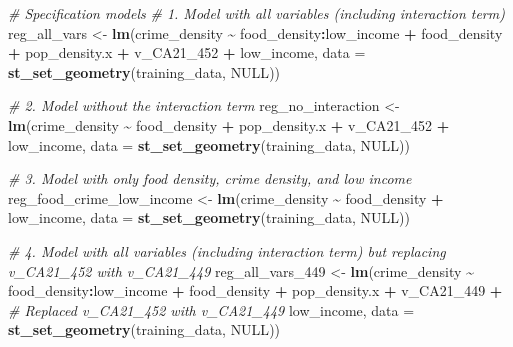 \documentclass[
]{article}
\newenvironment{Shaded}{\begin{snugshade}}{\end{snugshade}}
\newcommand{\AttributeTok}[1]{\textcolor[rgb]{0.13,0.29,0.53}{#1}}
\newcommand{\CommentTok}[1]{\textcolor[rgb]{0.56,0.35,0.01}{\textit{#1}}}
\newcommand{\ConstantTok}[1]{\textcolor[rgb]{0.56,0.35,0.01}{#1}}
\newcommand{\FunctionTok}[1]{\textcolor[rgb]{0.13,0.29,0.53}{\textbf{#1}}}
\newcommand{\NormalTok}[1]{#1}
\newcommand{\OtherTok}[1]{\textcolor[rgb]{0.56,0.35,0.01}{#1}}
\newcommand{\SpecialCharTok}[1]{\textcolor[rgb]{0.81,0.36,0.00}{\textbf{#1}}}
\begin{document}
\begin{Shaded}
\begin{Highlighting}[]
\CommentTok{\# Specification models}
\CommentTok{\# 1. Model with all variables (including interaction term)}
\NormalTok{reg\_all\_vars }\OtherTok{\textless{}{-}} \FunctionTok{lm}\NormalTok{(crime\_density }\SpecialCharTok{\textasciitilde{}} 
\NormalTok{                   food\_density}\SpecialCharTok{:}\NormalTok{low\_income }\SpecialCharTok{+} 
\NormalTok{                   food\_density }\SpecialCharTok{+} 
\NormalTok{                   pop\_density.x }\SpecialCharTok{+} 
\NormalTok{                   v\_CA21\_452 }\SpecialCharTok{+}
\NormalTok{                   low\_income, }
                 \AttributeTok{data =} \FunctionTok{st\_set\_geometry}\NormalTok{(training\_data, }\ConstantTok{NULL}\NormalTok{))}

\CommentTok{\# 2. Model without the interaction term}
\NormalTok{reg\_no\_interaction }\OtherTok{\textless{}{-}} \FunctionTok{lm}\NormalTok{(crime\_density }\SpecialCharTok{\textasciitilde{}} 
\NormalTok{                         food\_density }\SpecialCharTok{+} 
\NormalTok{                         pop\_density.x }\SpecialCharTok{+} 
\NormalTok{                         v\_CA21\_452 }\SpecialCharTok{+}
\NormalTok{                         low\_income, }
                       \AttributeTok{data =} \FunctionTok{st\_set\_geometry}\NormalTok{(training\_data, }\ConstantTok{NULL}\NormalTok{))}

\CommentTok{\# 3. Model with only food density, crime density, and low income}
\NormalTok{reg\_food\_crime\_low\_income }\OtherTok{\textless{}{-}} \FunctionTok{lm}\NormalTok{(crime\_density }\SpecialCharTok{\textasciitilde{}} 
\NormalTok{                                food\_density }\SpecialCharTok{+} 
\NormalTok{                                low\_income, }
                              \AttributeTok{data =} \FunctionTok{st\_set\_geometry}\NormalTok{(training\_data, }\ConstantTok{NULL}\NormalTok{))}

\CommentTok{\# 4. Model with all variables (including interaction term) but replacing v\_CA21\_452 with v\_CA21\_449}
\NormalTok{reg\_all\_vars\_449 }\OtherTok{\textless{}{-}} \FunctionTok{lm}\NormalTok{(crime\_density }\SpecialCharTok{\textasciitilde{}} 
\NormalTok{                       food\_density}\SpecialCharTok{:}\NormalTok{low\_income }\SpecialCharTok{+} 
\NormalTok{                       food\_density }\SpecialCharTok{+} 
\NormalTok{                       pop\_density.x }\SpecialCharTok{+} 
\NormalTok{                       v\_CA21\_449 }\SpecialCharTok{+}  \CommentTok{\# Replaced v\_CA21\_452 with v\_CA21\_449}
\NormalTok{                       low\_income, }
                     \AttributeTok{data =} \FunctionTok{st\_set\_geometry}\NormalTok{(training\_data, }\ConstantTok{NULL}\NormalTok{))}


\end{Highlighting}
\end{Shaded}
\end{document}
